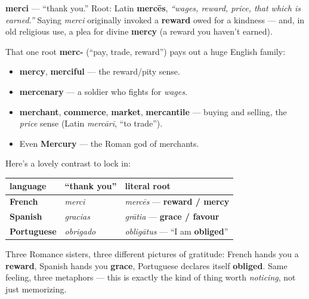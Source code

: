 \begin{cousinweb}
\textbf{merci} — \textquotedblleft{}thank you.\textquotedblright{} Root: Latin \textbf{mercēs}, \emph{\textquotedblleft{}wages, reward, price, that which is earned.\textquotedblright{}} Saying \emph{merci} originally invoked a \textbf{reward} owed for a kindness — and, in old religious use, a plea for divine \textbf{mercy} (a reward you haven't earned).

That one root \textbf{merc-} (\textquotedblleft{}pay, trade, reward\textquotedblright{}) pays out a huge English family:

\begin{itemize}
\raggedright
  \item \textbf{mercy}, \textbf{merciful} — the reward/pity sense.
  \item \textbf{mercenary} — a soldier who fights for \emph{wages}.
  \item \textbf{merchant}, \textbf{commerce}, \textbf{market}, \textbf{mercantile} — buying and selling, the \emph{price} sense (Latin \emph{mercārī}, \textquotedblleft{}to trade\textquotedblright{}).
  \item Even \textbf{Mercury} — the Roman god of merchants.
\end{itemize}
\end{cousinweb}

\begin{culture}
Here's a lovely contrast to lock in:

\noindent
\begin{tabularx}{\linewidth}{@{}>{\raggedright\arraybackslash}X>{\raggedright\arraybackslash}X>{\raggedright\arraybackslash}X@{}}
\toprule
\textbf{language} & \textbf{\textquotedblleft{}thank you\textquotedblright{}} & \textbf{literal root} \\
\midrule
\textbf{French} & \emph{merci} & \emph{mercēs} — \textbf{reward / mercy} \\
\textbf{Spanish} & \emph{gracias} & \emph{grātia} — \textbf{grace / favour} \\
\textbf{Portuguese} & \emph{obrigado} & \emph{obligātus} — \textquotedblleft{}I am \textbf{obliged}\textquotedblright{} \\
\bottomrule
\end{tabularx}

Three Romance sisters, three different pictures of gratitude: French hands you a \textbf{reward}, Spanish hands you \textbf{grace}, Portuguese declares itself \textbf{obliged}. Same feeling, three metaphors — this is exactly the kind of thing worth \emph{noticing}, not just memorizing.
\end{culture}

